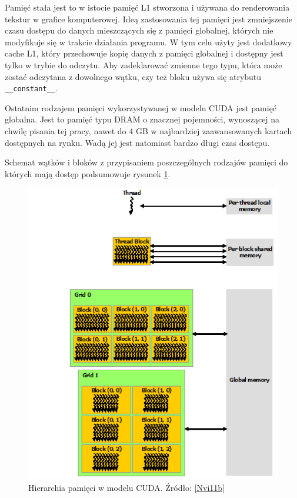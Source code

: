 Pamięć stała jest to w istocie pamięć L1 stworzona i używana do renderowania tekstur 
w grafice komputerowej. Ideą zastosowania tej pamięci jest zmniejszenie czasu
dostępu do danych mieszczących się z pamięci globalnej, których nie modyfikuje się w trakcie działania programu.
W tym celu użyty jest dodatkowy cache L1, który przechowuje kopię danych 
z pamięci globalnej i dostępny jest tylko w trybie do odczytu.
Aby zadeklarować zmienne tego typu, która może zostać odczytana z dowolnego
wątku, czy też bloku używa się atrybutu \texttt{\_\_constant\_\_}.

Ostatnim rodzajem pamięci wykorzystywanej w modelu CUDA jest pamięć globalna.
Jest to pamięć typu DRAM o znacznej pojemności, wynoszącej na chwilę pisania tej
pracy, nawet do 4 GB w najbardziej zaawansowanych kartach dostępnych na rynku. 
Wadą jej jest natomiast bardzo długi czas dostępu.

Schemat wątków i bloków z przypisaniem poszczególnych rodzajów pamięci do których
mają dostęp podsumowuje rysunek \ref{hier}.

\begin{figure}[H]
\centering
\includegraphics[scale=0.8]{images/memory-hierarchy.png}
\caption{Hierarchia pamięci w modelu CUDA. Źródło: \ref{Nvi11b}}
\label{hier}
\end{figure}

